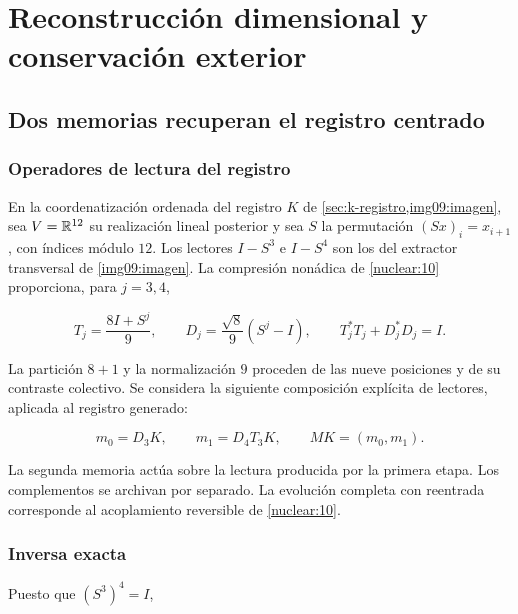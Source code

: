 \section{Reconstrucción dimensional y conservación exterior}
\label{nuclear:11}
\subsection{Dos memorias recuperan el registro centrado}

\subsubsection{Operadores de lectura del registro}

En la coordenatización ordenada del registro \(K\) de
\cref{sec:k-registro,img09:imagen}, sea \(V=\mathbb R^{12}\) su
realización lineal posterior y sea \(S\) la permutación
\((Sx)_i=x_{i+1}\), con índices módulo \(12\).
Los lectores \(I-S^3\) e \(I-S^4\) son los del extractor transversal
de \cref{img09:imagen}.
La compresión nonádica de \cref{nuclear:10} proporciona,
para \(j=3,4\),



\begin{equation}
T_j=\frac{8I+S^j}{9},\qquad D_j=\frac{\sqrt8}{9}(S^j-I),
\qquad T_j^*T_j+D_j^*D_j=I.
\label{nuc11:eq:1}
\end{equation}



La partición \(8+1\) y la normalización \(9\) proceden de las nueve
posiciones y de su contraste colectivo.
Se considera la siguiente composición explícita de lectores,
aplicada al registro generado:



\begin{equation}
m_0=D_3K,\qquad m_1=D_4T_3K,
\qquad M K=(m_0,m_1).
\label{nuc11:eq:2}
\end{equation}



La segunda memoria actúa sobre la lectura producida por la primera
etapa. Los complementos se archivan por separado.
La evolución completa con reentrada corresponde al acoplamiento
reversible de \cref{nuclear:10}.

\subsubsection{Inversa exacta}

Puesto que \((S^3)^4=I\),



